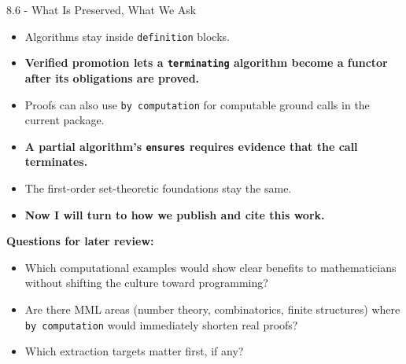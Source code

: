 \documentclass[aspectratio=169,11pt]{beamer}
\begin{document}
\begin{frame}[fragile,t]{8.6 - What Is Preserved, What We Ask}
\begin{itemize}
\setlength{\itemsep}{1pt}
\setlength{\parsep}{0pt}
\setlength{\parskip}{0pt}
\item Algorithms stay inside \texttt{definition} blocks.
\item \textcolor{blue!55!black}{\textbf{Verified promotion lets a \texttt{terminating} algorithm become a functor after its obligations are proved.}}
\item Proofs can also use \texttt{by computation} for computable ground calls in the current package.
\item \textcolor{blue!55!black}{\textbf{A partial algorithm's \texttt{ensures} requires evidence that the call terminates.}}
\item The first-order set-theoretic foundations stay the same.
\item \textcolor{blue!55!black}{\textbf{Now I will turn to how we publish and cite this work.}}
\end{itemize}
\smallskip
\textbf{Questions for later review:}
\begin{itemize}
\setlength{\itemsep}{1pt}
\setlength{\parsep}{0pt}
\setlength{\parskip}{0pt}
\item Which computational examples would show clear benefits to mathematicians without shifting the culture toward programming?
\item Are there MML areas (number theory, combinatorics, finite structures) where \texttt{by computation} would immediately shorten real proofs?
\item Which extraction targets matter first, if any?
\end{itemize}
\end{frame}
\end{document}
